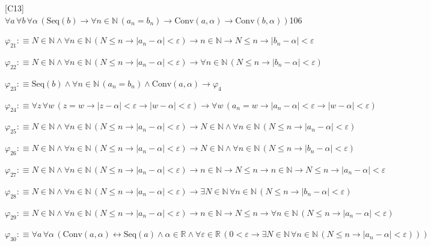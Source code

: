 \begin{fullproof}{[C13]}{$\forall a\,\forall b\,\forall \alpha\,(\mathrm{Seq}(b) \to \forall n \in \mathbb{N}\,(a_{n} = b_{n}) \to \mathrm{Conv}(a,\alpha) \to \mathrm{Conv}(b,\alpha))$}{106}
\begin{abbrevlist}
\item $\varphi_{21} :\equiv N \in \mathbb{N} \land \forall n \in \mathbb{N}\,(N \leq n \to \lvert a_{n} - \alpha \rvert < \varepsilon) \to n \in \mathbb{N} \to N \leq n \to \lvert b_{n} - \alpha \rvert < \varepsilon$
\item $\varphi_{22} :\equiv N \in \mathbb{N} \land \forall n \in \mathbb{N}\,(N \leq n \to \lvert a_{n} - \alpha \rvert < \varepsilon) \to \forall n \in \mathbb{N}\,(N \leq n \to \lvert b_{n} - \alpha \rvert < \varepsilon)$
\item $\varphi_{23} :\equiv \mathrm{Seq}(b) \land \forall n \in \mathbb{N}\,(a_{n} = b_{n}) \land \mathrm{Conv}(a,\alpha) \to \varphi_{4}$
\item $\varphi_{24} :\equiv \forall z\,\forall w\,(z = w \to \lvert z - \alpha \rvert < \varepsilon \to \lvert w - \alpha \rvert < \varepsilon) \to \forall w\,(a_{n} = w \to \lvert a_{n} - \alpha \rvert < \varepsilon \to \lvert w - \alpha \rvert < \varepsilon)$
\item $\varphi_{25} :\equiv N \in \mathbb{N} \land \forall n \in \mathbb{N}\,(N \leq n \to \lvert a_{n} - \alpha \rvert < \varepsilon) \to N \in \mathbb{N} \land \forall n \in \mathbb{N}\,(N \leq n \to \lvert a_{n} - \alpha \rvert < \varepsilon)$
\item $\varphi_{26} :\equiv N \in \mathbb{N} \land \forall n \in \mathbb{N}\,(N \leq n \to \lvert a_{n} - \alpha \rvert < \varepsilon) \to N \in \mathbb{N} \land \forall n \in \mathbb{N}\,(N \leq n \to \lvert b_{n} - \alpha \rvert < \varepsilon)$
\item $\varphi_{27} :\equiv N \in \mathbb{N} \land \forall n \in \mathbb{N}\,(N \leq n \to \lvert a_{n} - \alpha \rvert < \varepsilon) \to n \in \mathbb{N} \to N \leq n \to n \in \mathbb{N} \to N \leq n \to \lvert a_{n} - \alpha \rvert < \varepsilon$
\item $\varphi_{28} :\equiv N \in \mathbb{N} \land \forall n \in \mathbb{N}\,(N \leq n \to \lvert a_{n} - \alpha \rvert < \varepsilon) \to \exists N \in \mathbb{N}\,\forall n \in \mathbb{N}\,(N \leq n \to \lvert b_{n} - \alpha \rvert < \varepsilon)$
\item $\varphi_{29} :\equiv N \in \mathbb{N} \land \forall n \in \mathbb{N}\,(N \leq n \to \lvert a_{n} - \alpha \rvert < \varepsilon) \to n \in \mathbb{N} \to N \leq n \to \forall n \in \mathbb{N}\,(N \leq n \to \lvert a_{n} - \alpha \rvert < \varepsilon)$
\item $\varphi_{30} :\equiv \forall a\,\forall \alpha\,(\mathrm{Conv}(a,\alpha) \leftrightarrow \mathrm{Seq}(a) \land \alpha \in \mathbb{R} \land \forall \varepsilon \in \mathbb{R}\,(0 < \varepsilon \to \exists N \in \mathbb{N}\,\forall n \in \mathbb{N}\,(N \leq n \to \lvert a_{n} - \alpha \rvert < \varepsilon)))$

\end{abbrevlist}
\end{fullproof}
